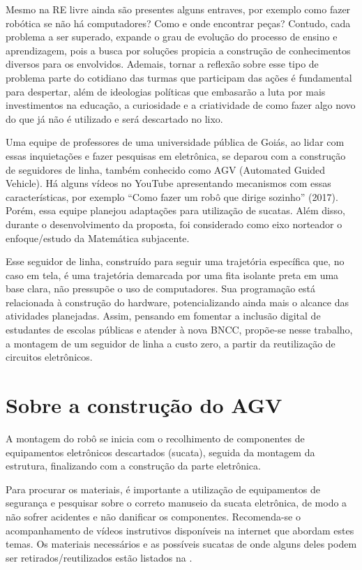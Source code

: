 \documentclass{textolivre-html}
\begin{document}
Mesmo na RE livre ainda são presentes alguns entraves, por exemplo como fazer
robótica se não há computadores? Como e onde encontrar peças? Contudo, cada
problema a ser superado, expande o grau de evolução do processo de ensino e
aprendizagem, pois a busca por soluções propicia a construção de conhecimentos
diversos para os envolvidos. Ademais, tornar a reflexão sobre esse tipo de
problema parte do cotidiano das turmas que participam das ações é fundamental
para despertar, além de ideologias políticas que embasarão a luta por mais
investimentos na educação, a curiosidade e a criatividade de como fazer algo
novo do que já não é utilizado e será descartado no lixo.

Uma equipe de professores de uma universidade pública de Goiás, ao lidar com
essas inquietações e fazer pesquisas em eletrônica, se deparou com a construção
de seguidores de linha, também conhecido como AGV (Automated Guided Vehicle).
Há alguns vídeos no YouTube apresentando mecanismos com essas características,
por exemplo “Como fazer um robô que dirige sozinho” (2017). Porém, essa equipe
planejou adaptações para utilização de sucatas. Além disso, durante o
desenvolvimento da proposta, foi considerado como eixo norteador o
enfoque/estudo da Matemática subjacente.

Esse seguidor de linha, construído para seguir uma trajetória específica que,
no caso em tela, é uma trajetória demarcada por uma fita isolante preta em uma
base clara, não pressupõe o uso de computadores. Sua programação está
relacionada à construção do hardware, potencializando ainda mais o alcance das
atividades planejadas. Assim, pensando em fomentar a inclusão digital de
estudantes de escolas públicas e atender à nova BNCC, propõe-se nesse trabalho,
a montagem de um seguidor de linha a custo zero, a partir da reutilização de
circuitos eletrônicos.


\section{Sobre a construção do AGV}\label{sec-contrucao}
A montagem do robô se inicia com o recolhimento de componentes de equipamentos
eletrônicos descartados (sucata), seguida da montagem da estrutura, finalizando
com a construção da parte eletrônica.

Para procurar os materiais, é importante a utilização de equipamentos de
segurança e pesquisar sobre o correto manuseio da sucata eletrônica, de modo a
não sofrer acidentes e não danificar os componentes. Recomenda-se o
acompanhamento de vídeos instrutivos disponíveis na internet que abordam estes
temas. Os materiais necessários e as possíveis sucatas de onde alguns deles
podem ser retirados/reutilizados estão listados na .
\end{document}
